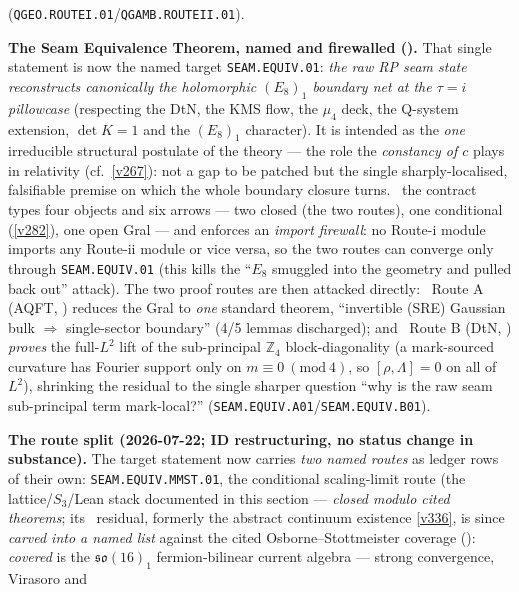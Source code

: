 \documentclass[11pt,a4paper]{article}
\begin{document}
\begin{keybox}
(\texttt{QGEO.ROUTEI.01}/\texttt{QGAMB.ROUTEII.01}).
\par\smallskip\noindent\textbf{The Seam Equivalence Theorem, named and firewalled
().} That single statement is now the named target
\texttt{SEAM.EQUIV.01}: \emph{the raw RP seam state reconstructs canonically the holomorphic $(E_8)_1$ boundary
net at the $\tau{=}i$ pillowcase} (respecting the DtN, the KMS flow, the $\mu_4$ deck, the Q-system extension,
$\det K{=}1$ and the $(E_8)_1$ character). It is intended as the \emph{one} irreducible structural postulate of
the theory --- the role the \emph{constancy of $c$} plays in relativity (cf.\ \vref{v267}): not a gap to be
patched but the single sharply-localised, falsifiable premise on which the whole boundary closure turns.
\mE\ the contract types four objects and six arrows --- two closed
(the two routes), one conditional (\vref{v282}), one open Gral --- and enforces an \emph{import firewall}: no
Route-i module imports any Route-ii module or vice versa, so the two routes can converge only through
\texttt{SEAM.EQUIV.01} (this kills the ``$E_8$ smuggled into the geometry and pulled back out'' attack). The two
proof routes are then attacked directly: \mE\ Route A (AQFT, )
reduces the Gral to \emph{one} standard theorem, ``invertible (SRE) Gaussian bulk $\Rightarrow$ single-sector
boundary'' (4/5 lemmas discharged); and \mE\ Route B (DtN, )
\emph{proves} the full-$L^2$ lift of the sub-principal $\mathbb{Z}_4$ block-diagonality (a mark-sourced curvature
has Fourier support only on $m\equiv0\ (\mathrm{mod}\ 4)$, so $[\rho,\Lambda]{=}0$ on all of $L^2$), shrinking the
residual to the single sharper question ``why is the raw seam sub-principal term mark-local?''
(\texttt{SEAM.EQUIV.A01}/\texttt{SEAM.EQUIV.B01}).
\par\smallskip\noindent\textbf{The route split (2026-07-22; ID restructuring, no status change in
substance).} The target statement now carries \emph{two named routes} as ledger rows of their own:
\texttt{SEAM.EQUIV.MMST.01}, the conditional scaling-limit route (the lattice/$S_3$/Lean stack
documented in this section --- \emph{closed modulo cited theorems}; its \mO\ residual, formerly the
abstract continuum existence \vref{v336}, is since \emph{carved into a named list} against the
cited Osborne--Stottmeister coverage (): \emph{covered} is
the $\mathfrak{so}(16)_1$ fermion-bilinear current algebra --- strong convergence, Virasoro and

\end{keybox}
\end{document}
